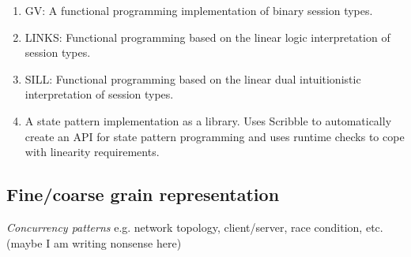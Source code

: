 \begin{enumerate}
	\item	GV:			A functional programming implementation of binary session types.
	\item	LINKS:		Functional programming based on the linear logic interpretation of session types.
	\item	SILL:		Functional programming based on the linear dual intuitionistic interpretation of session types.

	\item	A state pattern implementation as a library. Uses Scribble to automatically
			create an API for state pattern programming and uses runtime checks to
			cope with linearity requirements.

\end{enumerate}

\subsection{Fine/coarse grain representation}

{\em Concurrency patterns} e.g. network topology, client/server, race condition, etc. (maybe I am writing nonsense here)


